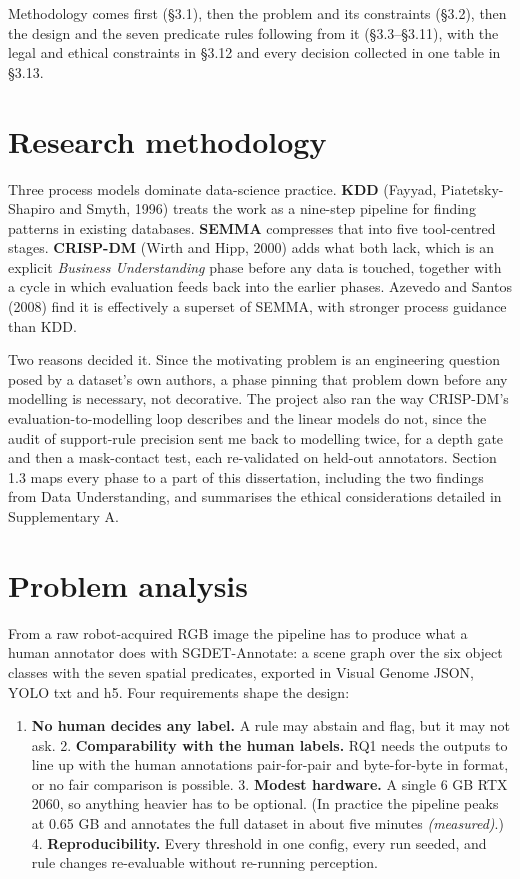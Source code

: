 
Methodology comes first (\S{}3.1), then the problem and its constraints (\S{}3.2), then the design and the seven predicate rules following from it (\S{}3.3--\S{}3.11), with the legal and ethical constraints in \S{}3.12 and every decision collected in one table in \S{}3.13.

\section{Research methodology}

Three process models dominate data-science practice. \textbf{KDD} (Fayyad, Piatetsky-Shapiro and Smyth, 1996) treats the work as a nine-step pipeline for finding patterns in existing databases. \textbf{SEMMA} compresses that into five tool-centred stages. \textbf{CRISP-DM} (Wirth and Hipp, 2000) adds what both lack, which is an explicit \textit{Business Understanding} phase before any data is touched, together with a cycle in which evaluation feeds back into the earlier phases. Azevedo and Santos (2008) find it is effectively a superset of SEMMA, with stronger process guidance than KDD.

Two reasons decided it. Since the motivating problem is an engineering question posed by a dataset's own authors, a phase pinning that problem down before any modelling is necessary, not decorative. The project also ran the way CRISP-DM's evaluation-to-modelling loop describes and the linear models do not, since the audit of support-rule precision sent me back to modelling twice, for a depth gate and then a mask-contact test, each re-validated on held-out annotators. Section 1.3 maps every phase to a part of this dissertation, including the two findings from Data Understanding, and summarises the ethical considerations detailed in Supplementary A.

\section{Problem analysis}

From a raw robot-acquired RGB image the pipeline has to produce what a human annotator does with SGDET-Annotate: a scene graph over the six object classes with the seven spatial predicates, exported in Visual Genome JSON, YOLO txt and h5. Four requirements shape the design:

\begin{enumerate}
\item \textbf{No human decides any label.} A rule may abstain and flag, but it may not
ask. 2. \textbf{Comparability with the human labels.} RQ1 needs the outputs to line up with the human annotations pair-for-pair and byte-for-byte in format, or no fair comparison is possible. 3. \textbf{Modest hardware.} A single 6 GB RTX 2060, so anything heavier has to be optional. (In practice the pipeline peaks at 0.65 GB and annotates the full dataset in about five minutes \textit{(measured)}.) 4. \textbf{Reproducibility.} Every threshold in one config, every run seeded, and rule changes re-evaluable without re-running perception.
\end{enumerate}

